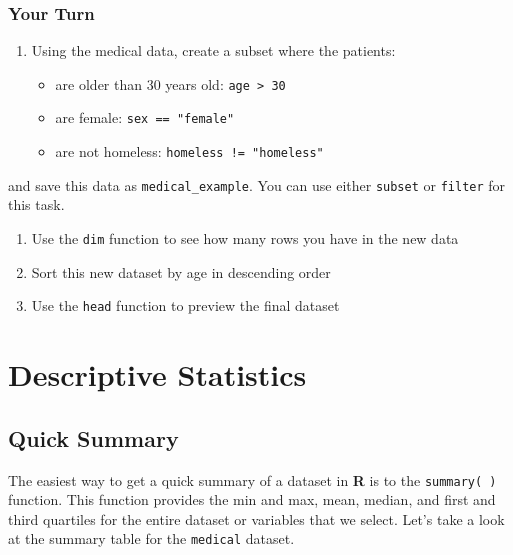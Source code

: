 \documentclass[]{book}
\providecommand{\tightlist}{%
  \setlength{\itemsep}{0pt}\setlength{\parskip}{0pt}}
\begin{document}
\hypertarget{your-turn-3}{%
\subsection{Your Turn}\label{your-turn-3}}

\begin{enumerate}
\def\labelenumi{\arabic{enumi}.}
\item
  Using the medical data, create a subset where the patients:

  \begin{itemize}
  \tightlist
  \item
    are older than 30 years old: \texttt{age\ \textgreater{}\ 30}
  \item
    are female: \texttt{sex\ ==\ "female"}
  \item
    are not homeless: \texttt{homeless\ !=\ "homeless"}
  \end{itemize}
\end{enumerate}

and save this data as \texttt{medical\_example}. You can use either \texttt{subset} or \texttt{filter} for this task.

\begin{enumerate}
\def\labelenumi{\arabic{enumi}.}
\setcounter{enumi}{1}
\item
  Use the \texttt{dim} function to see how many rows you have in the new data
\item
  Sort this new dataset by age in descending order
\item
  Use the \texttt{head} function to preview the final dataset
\end{enumerate}

\hypertarget{part3}{%
\chapter{Descriptive Statistics}\label{part3}}

\hypertarget{quick-summary}{%
\section{Quick Summary}\label{quick-summary}}

The easiest way to get a quick summary of a dataset in \textbf{R} is to the \texttt{summary(\ )} function. This function provides the min and max, mean, median, and first and third quartiles for the entire dataset or variables that we select. Let's take a look at the summary table for the \texttt{medical} dataset.
\end{document}
